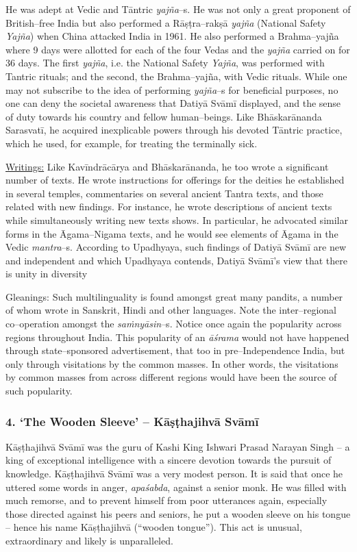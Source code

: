 He was adept at Vedic and Tāntric \textit{yajña}–s. He was not only a great proponent of British–free India but also performed a Rāṣṭra–rakṣā \textit{yajña} (National Safety \textit{Yajña}) when China attacked India in 1961. He also performed a Brahma–yajña where 9 days were allotted for each of the four Vedas and the \textit{yajña} carried on for 36 days. The first \textit{yajña}, i.e. the National Safety \textit{Yajña}, was performed with Tantric rituals; and the second, the Brahma–yajña, with Vedic rituals. While one may not subscribe to the idea of performing \textit{yajña}–s for beneficial purposes, no one can deny the societal awareness that Datiyā Svāmī displayed, and the sense of duty towards his country and fellow human–beings. Like Bhāskarānanda Sarasvatī, he acquired inexplicable powers through his devoted Tāntric practice, which he used, for example, for treating the terminally sick.

\underline{Writings:} Like Kavīndrācārya and Bhāskarānanda, he too wrote a significant number of texts. He wrote instructions for offerings for the deities he established in several temples, commentaries on several ancient Tantra texts, and those related with new findings. For instance, he wrote descriptions of ancient texts while simultaneously writing new texts shows. In particular, he advocated similar forms in the Āgama–Nigama texts, and he would see elements of Āgama in the Vedic \textit{mantra}–s. According to Upadhyaya, such findings of Datiyā Svāmī are new and independent and which Upadhyaya contends, Datiyā Svāmī’s view that there is unity in diversity

Gleanings: Such multilinguality is found amongst great many pandits, a number of whom wrote in Sanskrit, Hindi and other languages. Note the inter–regional co–operation amongst the \textit{saṁnyāsin}–s. Notice once again the popularity across regions throughout India. This popularity of an \textit{āśrama} would not have happened through state–sponsored advertisement, that too in pre–Independence India, but only through visitations by the common masses. In other words, the visitations by common masses from across different regions would have been the source of such popularity.


\subsubsection*{4. ‘The Wooden Sleeve’ – Kāṣṭhajihvā Svāmī\protect{}}

Kāṣṭhajihvā Svāmī was the guru of Kashi King Ishwari Prasad Narayan Singh – a king of exceptional intelligence with a sincere devotion towards the pursuit of knowledge. Kāṣṭhajihvā Svāmī was a very modest person. It is said that once he uttered some words in anger, \textit{apaśabda}, against a senior monk. He was filled with much remorse, and to prevent himself from poor utterances again, especially those directed against his peers and seniors, he put a wooden sleeve on his tongue – hence his name Kāṣṭhajihvā (“wooden tongue”). This act is unusual, extraordinary and likely is unparalleled.

